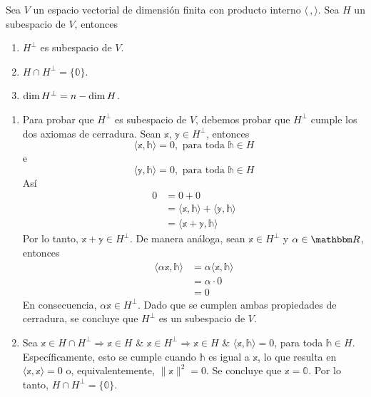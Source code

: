 \begin{theorem}
    Sea $V$ un espacio vectorial de dimensión finita con producto interno $\langle \, , \rangle$. Sea $H$ un subespacio de $V$, entonces
    \begin{enumerate}[label=\roman*)]
        \item $H^{\bot}$ es subespacio de $V$.
        \item $H \cap H^{\bot} = \{ \mathbb{0} \}$.
        \item $\operatorname{dim} H^{\bot} = n - \operatorname{dim} H$.
    \end{enumerate}
    \demostracion
    \begin{enumerate}[label=\roman*)]
        \item Para probar que $H^{\bot}$ es subespacio de $V$, debemos probar que $H^{\bot}$ cumple los dos axiomas de cerradura. Sean $\mathbb{x}$, $\mathbb{y} \in H^{\bot}$, entonces
        $$\langle \mathbb{x}, \mathbb{h} \rangle = 0, \text{ para toda } \mathbb{h} \in H$$
        e
        $$\langle \mathbb{y}, \mathbb{h} \rangle = 0, \text{ para toda } \mathbb{h} \in H$$
        Así
        \begin{align*}
            0 & = 0 + 0 \\
            & = \langle \mathbb{x}, \mathbb{h} \rangle + \langle \mathbb{y}, \mathbb{h} \rangle \\
            & = \langle \mathbb{x} + \mathbb{y}, \mathbb{h} \rangle
        \end{align*}
        Por lo tanto, $\mathbb{x} + \mathbb{y} \in H^{\bot}$. De manera análoga, sean $\mathbb{x} \in H^{\bot}$ y $\alpha \in \RR$, entonces
        \begin{align*}
            \langle \alpha \mathbb{x},  \mathbb{h} \rangle & = \alpha \langle \mathbb{x}, \mathbb{h} \rangle \\
            & = \alpha \cdot 0 \\
            & = 0
        \end{align*}
        En consecuencia, $\alpha \mathbb{x} \in H^{\bot}$. Dado que se cumplen ambas propiedades de cerradura, se concluye que $H^{\bot}$ es un subespacio de $V$.
        \item Sea $\mathbb{x} \in H \cap H^{\bot} \Longrightarrow \mathbb{x} \in H$ \& $\mathbb{x} \in H^{\bot} \Longrightarrow \mathbb{x} \in H$ \& $\langle \mathbb{x}, \mathbb{h} \rangle = 0$, para toda $\mathbb{h} \in H$. Específicamente, esto se cumple cuando $\mathbb{h}$ es igual a $\mathbb{x}$, lo que resulta en $\langle \mathbb{x}, \mathbb{x} \rangle = 0$ o, equivalentemente, $\| \mathbb{x} \|^2 = 0$. Se concluye que $\mathbb{x} = \mathbb{0}$. Por lo tanto, $H \cap H^{\bot} = \{ \mathbb{0} \}$.

\end{enumerate}
\end{theorem}
